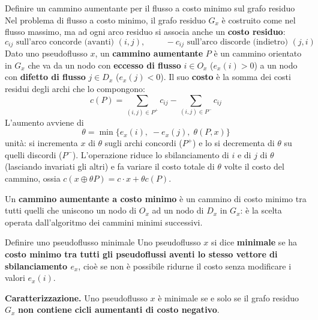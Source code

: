 \documentclass[12pt]{extarticle} %
\begin{document}
\begin{teoriabox}{Definire un cammino aumentante per il flusso a costo minimo sul grafo residuo}
Nel problema di flusso a costo minimo, il grafo residuo $G_x$ è costruito come nel flusso massimo, ma ad ogni arco residuo si associa anche un \textbf{costo residuo}: %
\[
c_{ij} \text{ sull'arco concorde (avanti) } (i,j), \hspace{1cm} -c_{ij} \text{ sull'arco discorde (indietro) } (j,i)
\] %
Dato uno pseudoflusso $x$, un \textbf{cammino aumentante} $P$ è un cammino orientato in $G_x$ che va da un nodo con \textbf{eccesso di flusso} $i \in O_x$ ($e_x(i) > 0$) a un nodo con \textbf{difetto di flusso} $j \in D_x$ ($e_x(j) < 0$). Il suo \textbf{costo} è la somma dei costi residui degli archi che lo compongono: %
\[
c(P) = \sum_{(i,j)\in P^+} c_{ij} - \sum_{(i,j)\in P^-} c_{ij}
\] %
L'aumento avviene di
\[
\theta = \min\Big\{ e_x(i), \; -e_x(j), \; \theta(P,x) \Big\}
\] %
unità: si incrementa $x$ di $\theta$ sugli archi concordi ($P^+$) e lo si decrementa di $\theta$ su quelli discordi ($P^-$). L'operazione riduce lo sbilanciamento di $i$ e di $j$ di $\theta$ (lasciando invariati gli altri) e fa variare il costo totale di $\theta$ volte il costo del cammino, ossia $c(x \oplus \theta P) = c \cdot x + \theta c(P)$. %

\noindent Un \textbf{cammino aumentante a costo minimo} è un cammino di costo minimo tra tutti quelli che uniscono un nodo di $O_x$ ad un nodo di $D_x$ in $G_x$: è la scelta operata dall'algoritmo dei cammini minimi successivi. %
\end{teoriabox}


\begin{teoriabox}{Definire uno pseudoflusso minimale}
Uno pseudoflusso $x$ si dice \textbf{minimale} se ha \textbf{costo minimo tra tutti gli pseudoflussi aventi lo stesso vettore di sbilanciamento $e_x$}, cioè se non è possibile ridurne il costo senza modificare i valori $e_x(i)$. %

\noindent\textbf{Caratterizzazione.} Uno pseudoflusso $x$ è minimale se e solo se il grafo residuo $G_x$ \textbf{non contiene cicli aumentanti di costo negativo}. %

\end{teoriabox}

\end{document}
